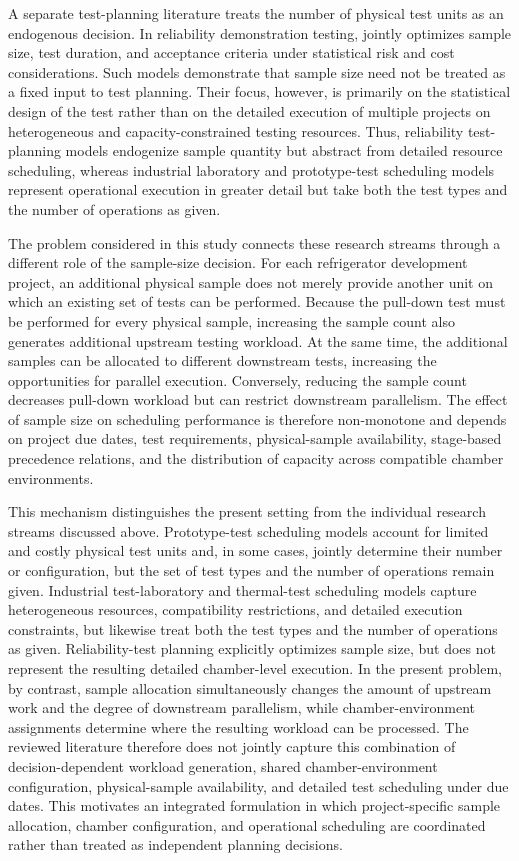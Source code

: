\documentclass[11pt]{article}
\begin{document}
A separate test-planning literature treats the number of physical test units
as an endogenous decision.
In reliability demonstration testing, \citet{Fernandez2022} jointly
optimizes sample size, test duration, and acceptance criteria under
statistical risk and cost considerations.
Such models demonstrate that sample size need not be treated as a fixed
input to test planning.
Their focus, however, is primarily on the statistical design of the test
rather than on the detailed execution of multiple projects on heterogeneous
and capacity-constrained testing resources.
Thus, reliability test-planning models endogenize sample quantity but
abstract from detailed resource scheduling, whereas industrial laboratory
and prototype-test scheduling models represent operational execution in
greater detail but take both the test types and the number of operations
as given.

The problem considered in this study connects these research streams through
a different role of the sample-size decision.
For each refrigerator development project, an additional physical sample
does not merely provide another unit on which an existing set of tests can
be performed.
Because the pull-down test must be performed for every physical sample,
increasing the sample count also generates additional upstream testing
workload.
At the same time, the additional samples can be allocated to different
downstream tests, increasing the opportunities for parallel execution.
Conversely, reducing the sample count decreases pull-down workload but can
restrict downstream parallelism.
The effect of sample size on scheduling performance is therefore
non-monotone and depends on project due dates, test requirements,
physical-sample availability, stage-based precedence relations, and the
distribution of capacity across compatible chamber environments.

This mechanism distinguishes the present setting from the individual
research streams discussed above.
Prototype-test scheduling models account for limited and costly physical
test units and, in some cases, jointly determine their number or
configuration, but the set of test types and the number of operations
remain given.
Industrial test-laboratory and thermal-test scheduling models capture
heterogeneous resources, compatibility restrictions, and detailed execution
constraints, but likewise treat both the test types and the number of
operations as given.
Reliability-test planning explicitly optimizes sample size, but does not
represent the resulting detailed chamber-level execution.
In the present problem, by contrast, sample allocation simultaneously
changes the amount of upstream work and the degree of downstream
parallelism, while chamber-environment assignments determine where the
resulting workload can be processed.
The reviewed literature therefore does not jointly capture this combination
of decision-dependent workload generation, shared chamber-environment
configuration, physical-sample availability, and detailed test scheduling
under due dates.
This motivates an integrated formulation in which project-specific sample
allocation, chamber configuration, and operational scheduling are
coordinated rather than treated as independent planning decisions.
\end{document}
